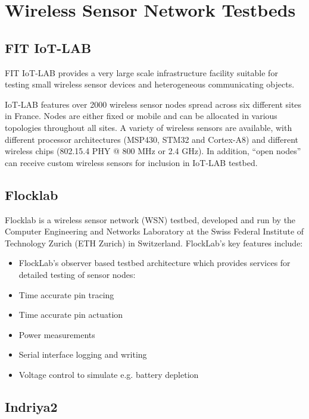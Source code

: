 \section{Wireless Sensor Network Testbeds}
\label{sec:wireless-sensor-networks}

\subsection{FIT IoT-LAB}
FIT IoT-LAB \cite{FIT-IoT} provides a very large scale infrastructure facility suitable for testing small wireless sensor devices and heterogeneous communicating objects.

IoT-LAB features over 2000 wireless sensor nodes spread across six different sites in France.  Nodes are either fixed or mobile and can be allocated in various topologies throughout all sites.  A variety of wireless sensors are available, with different processor architectures (MSP430, STM32 and Cortex-A8) and different wireless chips (802.15.4 PHY @ 800 MHz or 2.4 GHz).  In addition, “open nodes” can receive custom wireless sensors for inclusion in IoT-LAB testbed.

\subsection{Flocklab}

Flocklab \cite{flocklab} is a wireless sensor network (WSN) testbed, developed and run by the ​Computer Engineering and Networks Laboratory at the ​Swiss Federal Institute of Technology Zurich (ETH Zurich) in Switzerland. FlockLab's key features include:
\begin{itemize}
	\item FlockLab's observer based testbed architecture which provides services for detailed testing of sensor nodes:
	\item Time accurate pin tracing
	\item Time accurate pin actuation
	\item Power measurements
	\item Serial interface logging and writing
	\item Voltage control to simulate e.g. battery depletion
\end{itemize}

\subsection{Indriya2}

